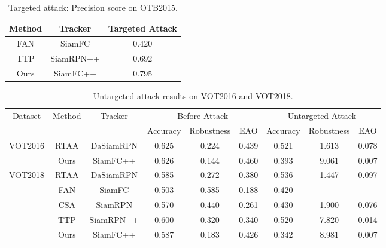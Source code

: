 \documentclass[12pt]{article}
\begin{document}
\begin{table}[h]
    \renewcommand\thetable{XI} 
    \centering
    \caption{Targeted attack: Precision score on OTB2015.}
    \begin{tabular}{@{}ccc@{}}
    \toprule
    Method & Tracker &  Targeted Attack \\
    \midrule
    FAN & SiamFC  &0.420 \\
    TTP & SiamRPN++ &0.692 \\
    \midrule
    Ours & SiamFC++  &0.795 \\ \bottomrule
    \end{tabular}
    \label{tab:targeted}
\end{table}

\begin{table}[t]
    \renewcommand\thetable{XII}
    \centering
    \renewcommand\tabcolsep{3.5pt} %
    \footnotesize
    \caption{Untargeted attack results on VOT2016 and VOT2018.}
    \begin{tabular}{ccc|ccc|ccc}
    \toprule
    \multirow{2}{*}{Dataset} & \multirow{2}{*}{Method} & \multirow{2}{*}{Tracker} & \multicolumn{3}{c}{Before Attack} & \multicolumn{3}{|c}{Untargeted Attack} \\
                             &                         &                          & Accuracy   & Robustness  & EAO    & Accuracy    & Robustness    & EAO     \\ \midrule
    \multirow{2}{*}{VOT2016} & RTAA                    & DaSiamRPN                & 0.625      & 0.224       & 0.439  & 0.521       & 1.613         & 0.078   \\
                             & Ours                    & SiamFC++                 & 0.626      & 0.144       & 0.460  & 0.393       & 9.061         & 0.007   \\ \midrule
    \multirow{5}{*}{VOT2018} & RTAA                    & DaSiamRPN                & 0.585      & 0.272       & 0.380  & 0.536       & 1.447         & 0.097   \\
                             & FAN                     & SiamFC                   & 0.503      & 0.585       & 0.188  & 0.420       & -             & -       \\
                             & CSA                     & SiamRPN                  & 0.570      & 0.440       & 0.261  & 0.430       & 1.900         & 0.076   \\
                             & TTP                     & SiamRPN++                & 0.600      & 0.320       & 0.340  & 0.520       & 7.820         & 0.014   \\
                             & Ours                    & SiamFC++                 & 0.587      & 0.183       & 0.426  & 0.342       & 8.981         & 0.007   \\ \bottomrule
    \end{tabular}
    \label{tab:sota_vot}
\end{table}
\end{document}
